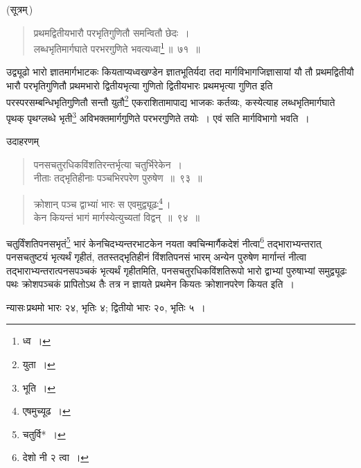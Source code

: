 \documentclass[10pt, openany]{book}
\begin{document}
{{{(सूत्रम्\textendash \,)}

\begin{quote}
    
{\bs  प्रथमद्वितीयभारौ परभृतिगुणितौ समन्वितौ छेदः~। \\
 लब्धभृतिमार्गघाते परभरगुणिते भवत्यध्वा\renewcommand{\thefootnote}{\s ६}\footnote{\s *ध्व~।}\,॥~७१~॥}\end{quote}

{उद्व्यूढो भारो ज्ञातमार्गभाटकः कियताप्यध्वखण्डेन ज्ञातभूतिर्यदा तदा
मार्गविभागजिज्ञासायां यौ तौ प्रथमद्वितीयौ भारौ परभृतिगुणितौ प्रथमभारो
द्वितीयभृत्या गुणितो}
{द्वितीयभारः प्रथमभृत्या गुणित इति परस्परसम्बन्धिभृतिगुणितौ सन्तौ
युतौ\renewcommand{\thefootnote}{\s ७}\footnote{\s युता~।} एकराशितामापाद्य}
{भाजकः कर्तव्यः, कस्येत्याह लब्धभृतिमार्गघाते पृथक् पृथग्लब्धे भृती\renewcommand{\thefootnote}{\s ८}\footnote{\s भूति~।}
अविभक्तमार्गगुणिते}
{परभरगुणिते तयोः~। एवं सति मार्गविभागो भवति~।}

\vspace{3mm}
{उदाहरणम्\textemdash}

\begin{quote}
    
{\eg पनसचतुरधिकविंशतिरन्तर्भृत्या चतुर्भिरेकेन~। \\
 नीताः तद्भृतिहीनाः पञ्चभिरपरेण पुरुषेण~॥~९३~॥}\end{quote}

\newpage

 \begin{quote}
{\eg क्रोशान् पञ्च द्वाभ्यां भारः स एवमुद्व्यूढः\renewcommand{\thefootnote}{\s १}\footnote{\s एषमुच्यूढ~।}\,। \\
 केन कियन्तं भागं मार्गस्येत्युच्यतां विद्वन्~॥~९४~॥}\end{quote} 

{चतुर्विंशतिपनसभृतं\renewcommand{\thefootnote}{\s २}\footnote{\s चतुर्वि*~।} भारं केनचिदभ्यन्तरभाटकेन नयता
क्वचिन्मार्गैकदेशं नीत्वा\renewcommand{\thefootnote}{\s ३}\footnote{\s *देशो नी २ त्वा~।}}
{तद्भाराभ्यन्तरात् पनसचतुष्टयं भृत्यर्थं गृहीतं, ततस्तद्भृतिहीनं
विंशतिपनसं भारम् अन्येन पुरुषेण}
{मार्गान्तं नीत्वा तद्भाराभ्यन्तरात्पनसपञ्चकं भृत्यर्थं गृहीतमिति,
पनसचतुरधिकविंशतिरूपो}
{भारो द्वाभ्यां पुरुषाभ्यां समुद्व्यूढः पथः क्रोशपञ्चकं प्रापितोऽथ तैः
तत्र न ज्ञायते प्रथमेन}
{कियतः क्रोशानपरेण कियत इति~।}
\vspace{3mm}

{न्यासः\textendash \,प्रथमो भारः २४, भृतिः ४; द्वितीयो भारः २०, भृतिः ५~।}
\vspace{3mm}

}}
\end{document}
